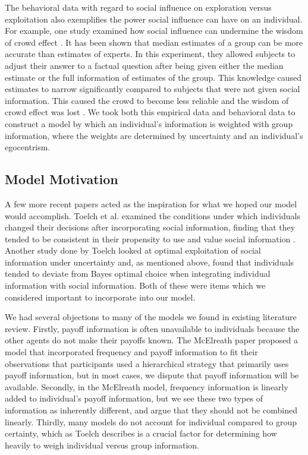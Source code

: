 \documentclass[11pt, a4paper]{article}
\begin{document}
The behavioral data with regard to social influence on exploration versus exploitation also exemplifies the power social influence can have on an individual. For example, one study examined how social influence can undermine the wisdom of crowd effect \cite{Lorenz2011}. It has been shown that median estimates of a group can be more accurate than estimates of experts. In this experiment, they allowed subjects to adjust their answer to a factual question after being given either the median estimate or the full information of estimates of the group. This knowledge caused estimates to narrow significantly compared to subjects that were not given social information. This caused the crowd to become less reliable and the wisdom of crowd effect was lost \cite{Lorenz2011}. We took both this empirical data and behavioral data to construct a model by which an individual's information is weighted with group information, where the weights are determined by uncertainty and an individual's egocentrism. 

\subsection{Model Motivation} 
A few more recent papers acted as the inspiration for what we hoped our model would accomplish. Toelch et al. \cite{Toelch2013a} examined the conditions under which individuals changed their decisions after incorporating social information, finding that they tended to be consistent in their propensity to use and value social information \cite{Toelch2013a}. Another study done by Toelch looked at optimal exploitation of social information under uncertainty \cite{Toelch2013} and, as mentioned above, found that individuals tended to deviate from Bayes optimal choice when integrating individual information with social information. Both of these were items which we considered important to incorporate into our model.

We had several objections to many of the models we found in existing literature review. Firstly, payoff information is often unavailable to individuals because the other agents do not make their payoffs known. The McElreath paper \cite{McElreathetalSuccessbias2008} proposed a model that incorporated frequency and payoff information to fit their observations that participants used a hierarchical strategy that primarily uses payoff information, but in most cases, we dispute that payoff information will be available. Secondly,  in the McElreath model, frequency information is linearly added to individual's payoff information, but we see these two types of information as inherently different, and argue that they should not be combined linearly. Thirdly, many models do not account for individual compared to group certainty, which as Toelch \cite{Toelch2013} describes is a crucial factor for determining how heavily to weigh individual versus group information.
\end{document}
